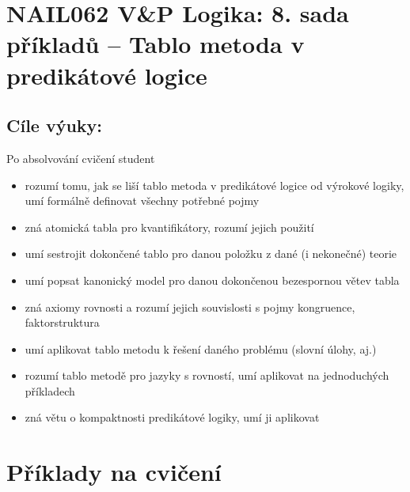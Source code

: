 \section*{NAIL062 V\&P Logika: 8. sada příkladů -- Tablo metoda v predikátové logice}


\subsection*{Cíle výuky:} Po absolvování cvičení student

    \begin{itemize}\setlength{\itemsep}{0pt}
        \item rozumí tomu, jak se liší tablo metoda v predikátové logice od výrokové logiky, umí formálně definovat všechny potřebné pojmy
        \item zná atomická tabla pro kvantifikátory, rozumí jejich použití
        \item umí sestrojit dokončené tablo pro danou položku z dané (i nekonečné) teorie
        \item umí popsat kanonický model pro danou dokončenou bezespornou větev tabla
        \item zná axiomy rovnosti a rozumí jejich souvislosti s pojmy kongruence, faktorstruktura
        \item umí aplikovat tablo metodu k řešení daného problému (slovní úlohy, aj.)
        \item rozumí tablo metodě pro jazyky s rovností, umí aplikovat na jednoduchých příkladech
        \item zná větu o kompaktnosti predikátové logiky, umí ji aplikovat
    \end{itemize}
    

\section*{Příklady na cvičení}
        
